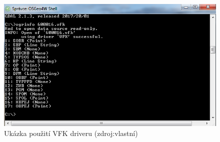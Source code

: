 \begin{figure}[H]
	 \centering
      \includegraphics[width=15cm]{./pictures/vfk_driver.png}
      \caption{Ukázka použití VFK driveru (zdroj:vlastní)}
      \label{fig:vfk driver}
  \end{figure}

